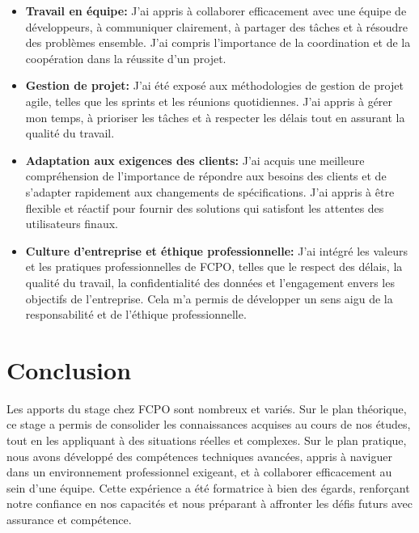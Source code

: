 \begin{itemize}
  \item \textbf{Travail en équipe: }J’ai appris à collaborer efficacement avec une équipe de développeurs, à communiquer clairement, à partager des tâches et à résoudre des problèmes ensemble. J’ai compris l’importance de la coordination et de la coopération dans la réussite d’un projet.
  \item \textbf{Gestion de projet: }J’ai été exposé aux méthodologies de gestion de projet agile, telles que les sprints et les réunions quotidiennes. J’ai appris à gérer mon temps, à prioriser les tâches et à respecter les délais tout en assurant la qualité du travail.
  \item \textbf{Adaptation aux exigences des clients: }J’ai acquis une meilleure compréhension de l’importance de répondre aux besoins des clients et de s’adapter rapidement aux changements de spécifications. J’ai appris à être flexible et réactif pour fournir des solutions qui satisfont les attentes des utilisateurs finaux.
  \item \textbf{Culture d’entreprise et éthique professionnelle: }J’ai intégré les valeurs et les pratiques professionnelles de FCPO, telles que le respect des délais, la qualité du travail, la confidentialité des données et l’engagement envers les objectifs de l’entreprise. Cela m’a permis de développer un sens aigu de la responsabilité et de l’éthique professionnelle.
\end{itemize}


\newpage
\section*{Conclusion}

\hspace{16pt}Les apports du stage chez FCPO sont nombreux et variés. Sur le plan théorique, ce stage a permis de consolider les connaissances acquises au cours de nos études, tout en les appliquant à des situations réelles et complexes. Sur le plan pratique, nous avons développé des compétences techniques avancées, appris à naviguer dans un environnement professionnel exigeant, et à collaborer efficacement au sein d'une équipe. Cette expérience a été formatrice à bien des égards, renforçant notre confiance en nos capacités et nous préparant à affronter les défis futurs avec assurance et compétence.
